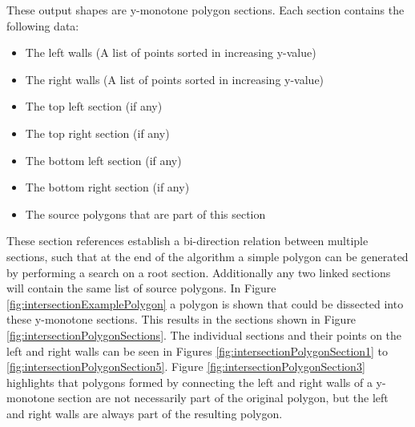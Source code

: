 \documentclass[12pt]{article}
\begin{document}
These output shapes are y-monotone polygon sections. Each section contains the following data:
\begin{itemize}
    \item The left walls (A list of points sorted in increasing y-value)
    \item The right walls (A list of points sorted in increasing y-value)
    \item The top left section (if any)
    \item The top right section (if any)
    \item The bottom left section (if any)
    \item The bottom right section (if any)
    \item The source polygons that are part of this section
\end{itemize}
These section references establish a bi-direction relation between multiple sections, such that at the end of the algorithm a simple polygon can be generated by performing a search on a root section. Additionally any two linked sections will contain the same list of source polygons.
In Figure \ref{fig:intersectionExamplePolygon} a polygon is shown that could be dissected into these y-monotone sections. This results in the sections shown in Figure \ref{fig:intersectionPolygonSections}. The individual sections and their points on the left and right walls can be seen in Figures \ref{fig:intersectionPolygonSection1} to \ref{fig:intersectionPolygonSection5}. Figure  \ref{fig:intersectionPolygonSection3} highlights that polygons formed by connecting the left and right walls of a y-monotone section are not necessarily part of the original polygon, but the left and right walls are always part of the resulting polygon.
\end{document}
